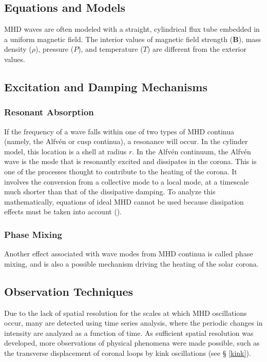 \documentclass[preprint2]{aastex}
\begin{document}
\subsection{Equations and Models}
MHD waves are often modeled with a straight, cylindrical flux tube embedded
in a uniform magnetic field. The interior values of magnetic field strength
($\mathbf{B}$), mass density ($\rho$), pressure ($P$), and temperature
($T$) are different from the exterior values.
\subsection{Excitation and Damping Mechanisms}
\subsubsection{Resonant Absorption}
If the frequency of a wave falls within one of two types of MHD
continua (namely, the Alfv\'en or cusp continua), a resonance will
occur.
In the cylinder model, this location is a shell at radius $r$.
In the Alfv\'en continuum, the Alfv\'en wave is the mode that is
resonantly excited and dissipates in the corona.
This is one of the processes thought to contribute to the heating
of the corona. It involves the conversion from a collective mode
to a local mode, at a timescale much shorter than that
of the dissipative damping.
To analyze this mathematically, equations of ideal MHD cannot be used
because dissipation effects must be taken into account
(\cite{Nak}).
\subsubsection{Phase Mixing}
Another effect associated with wave modes from MHD continua is called
phase mixing, and is also a possible mechanism driving the heating of
the solar corona.
\subsection{Observation Techniques}
Due to the lack of spatial resolution for the scales at which MHD
oscillations occur,
many are detected using time series analysis, where
the periodic changes in intensity are analyzed as a function of time.
As sufficient spatial resolution was developed, more observations
of physical phenomena were made possible,
such as the transverse displacement of coronal
loops by kink oscillations (see \S{} {\ref{kink}}).
\end{document}

